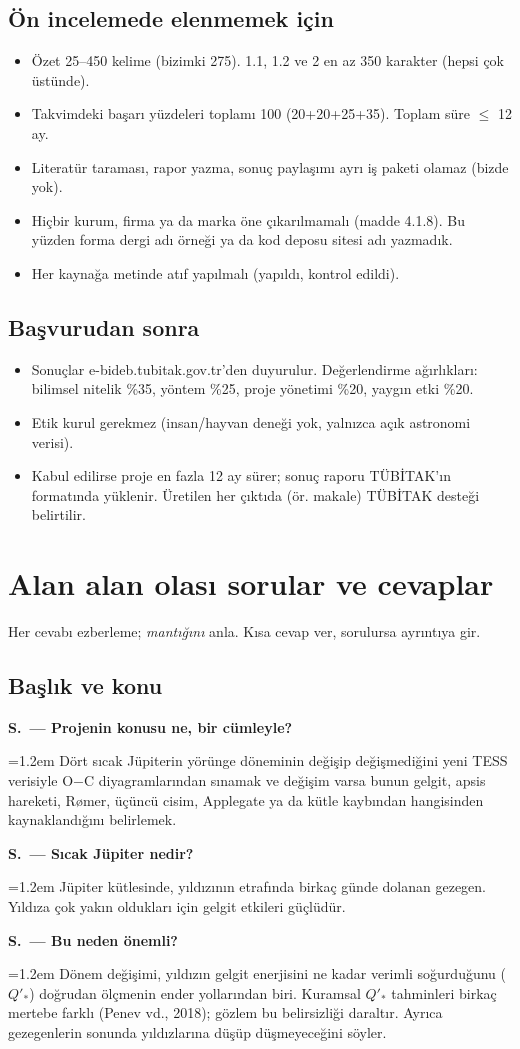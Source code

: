 \documentclass[11pt,a4paper]{article}
\newcounter{sor}[section]
\newcommand{\SC}[2]{\stepcounter{sor}\par\noindent\textbf{S\thesection.\thesor\ — #1}\par\nopagebreak
  \noindent\hangindent=1.2em\hangafter=0 #2\par\vspace{0.35em}}
\newcommand{\OC}{O$-$C}
\begin{document}
\subsection{Ön incelemede elenmemek için}
\begin{itemize}
\item Özet 25–450 kelime (bizimki 275). 1.1, 1.2 ve 2 en az 350 karakter (hepsi çok üstünde).
\item Takvimdeki başarı yüzdeleri toplamı 100 (20+20+25+35). Toplam süre $\leq$ 12 ay.
\item Literatür taraması, rapor yazma, sonuç paylaşımı ayrı iş paketi olamaz (bizde yok).
\item Hiçbir kurum, firma ya da marka öne çıkarılmamalı (madde 4.1.8). Bu yüzden forma dergi adı örneği ya da kod deposu sitesi adı yazmadık.
\item Her kaynağa metinde atıf yapılmalı (yapıldı, kontrol edildi).
\end{itemize}

\subsection{Başvurudan sonra}
\begin{itemize}
\item Sonuçlar e-bideb.tubitak.gov.tr'den duyurulur. Değerlendirme ağırlıkları: bilimsel nitelik \%35, yöntem \%25, proje yönetimi \%20, yaygın etki \%20.
\item Etik kurul gerekmez (insan/hayvan deneği yok, yalnızca açık astronomi verisi).
\item Kabul edilirse proje en fazla 12 ay sürer; sonuç raporu TÜBİTAK'ın formatında yüklenir. Üretilen her çıktıda (ör. makale) TÜBİTAK desteği belirtilir.
\end{itemize}

\section{Alan alan olası sorular ve cevaplar}
Her cevabı ezberleme; \emph{mantığını} anla. Kısa cevap ver, sorulursa ayrıntıya gir.

\subsection{Başlık ve konu}
\SC{Projenin konusu ne, bir cümleyle?}{Dört sıcak Jüpiterin yörünge döneminin değişip değişmediğini yeni TESS verisiyle \OC{} diyagramlarından sınamak ve değişim varsa bunun gelgit, apsis hareketi, Rømer, üçüncü cisim, Applegate ya da kütle kaybından hangisinden kaynaklandığını belirlemek.}
\SC{Sıcak Jüpiter nedir?}{Jüpiter kütlesinde, yıldızının etrafında birkaç günde dolanan gezegen. Yıldıza çok yakın oldukları için gelgit etkileri güçlüdür.}
\SC{Bu neden önemli?}{Dönem değişimi, yıldızın gelgit enerjisini ne kadar verimli soğurduğunu ($Q'_*$) doğrudan ölçmenin ender yollarından biri. Kuramsal $Q'_*$ tahminleri birkaç mertebe farklı (Penev vd., 2018); gözlem bu belirsizliği daraltır. Ayrıca gezegenlerin sonunda yıldızlarına düşüp düşmeyeceğini söyler.}
\end{document}
